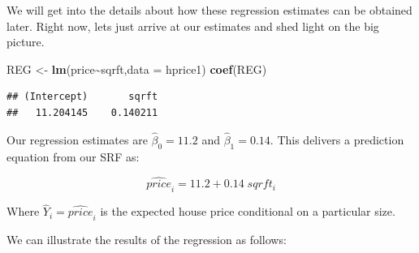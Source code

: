 \documentclass[
]{book}
\newenvironment{Shaded}{\begin{snugshade}}{\end{snugshade}}
\newcommand{\AttributeTok}[1]{\textcolor[rgb]{0.13,0.29,0.53}{#1}}
\newcommand{\DecValTok}[1]{\textcolor[rgb]{0.00,0.00,0.81}{#1}}
\newcommand{\FunctionTok}[1]{\textcolor[rgb]{0.13,0.29,0.53}{\textbf{#1}}}
\newcommand{\NormalTok}[1]{#1}
\newcommand{\OtherTok}[1]{\textcolor[rgb]{0.56,0.35,0.01}{#1}}
\newcommand{\SpecialCharTok}[1]{\textcolor[rgb]{0.81,0.36,0.00}{\textbf{#1}}}
\newcommand{\StringTok}[1]{\textcolor[rgb]{0.31,0.60,0.02}{#1}}
\begin{document}
We will get into the details about how these regression estimates can be obtained later. Right now, lets just arrive at our estimates and shed light on the big picture.

\begin{Shaded}
\begin{Highlighting}[]
\NormalTok{REG }\OtherTok{\textless{}{-}} \FunctionTok{lm}\NormalTok{(price}\SpecialCharTok{\textasciitilde{}}\NormalTok{sqrft,}\AttributeTok{data =}\NormalTok{ hprice1)}
\FunctionTok{coef}\NormalTok{(REG)}
\end{Highlighting}
\end{Shaded}

\begin{verbatim}
## (Intercept)       sqrft 
##   11.204145    0.140211
\end{verbatim}

Our regression estimates are \(\hat{\beta}_0=11.2\) and \(\hat{\beta}_1=0.14\). This delivers a prediction equation from our SRF as:

\[\widehat{price}_i=11.2+0.14 \; sqrft_i\]

Where \(\hat{Y}_i=\widehat{price}_i\) is the expected house price conditional on a particular size.

We can illustrate the results of the regression as follows:

\begin{Shaded}
\end{Shaded}
\end{document}
